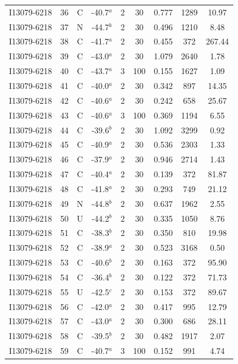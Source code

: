 \begin{table}
\begin{tabular}{ccccccccc}
I13079-6218 & 36 & C & -40.7$^{a}$ & 2 & 30 & 0.777 & 1289 & 10.97 \\
I13079-6218 & 37 & N & -44.7$^{b}$ & 2 & 30 & 0.496 & 1210 & 8.48 \\
I13079-6218 & 38 & C & -41.7$^{a}$ & 2 & 30 & 0.455 & 372 & 267.44 \\
I13079-6218 & 39 & C & -43.0$^{a}$ & 2 & 30 & 1.079 & 2640 & 1.78 \\
I13079-6218 & 40 & C & -43.7$^{a}$ & 3 & 100 & 0.155 & 1627 & 1.09 \\
I13079-6218 & 41 & C & -40.0$^{a}$ & 2 & 30 & 0.342 & 897 & 14.35 \\
I13079-6218 & 42 & C & -40.6$^{a}$ & 2 & 30 & 0.242 & 658 & 25.67 \\
I13079-6218 & 43 & C & -40.6$^{a}$ & 3 & 100 & 0.369 & 1194 & 6.55 \\
I13079-6218 & 44 & C & -39.6$^{b}$ & 2 & 30 & 1.092 & 3299 & 0.92 \\
I13079-6218 & 45 & C & -40.9$^{a}$ & 2 & 30 & 0.536 & 2303 & 1.33 \\
I13079-6218 & 46 & C & -37.9$^{a}$ & 2 & 30 & 0.946 & 2714 & 1.43 \\
I13079-6218 & 47 & C & -40.4$^{a}$ & 2 & 30 & 0.139 & 372 & 81.87 \\
I13079-6218 & 48 & C & -41.8$^{a}$ & 2 & 30 & 0.293 & 749 & 21.12 \\
I13079-6218 & 49 & N & -44.8$^{b}$ & 2 & 30 & 0.637 & 1962 & 2.55 \\
I13079-6218 & 50 & U & -44.2$^{b}$ & 2 & 30 & 0.335 & 1050 & 8.76 \\
I13079-6218 & 51 & C & -38.3$^{b}$ & 2 & 30 & 0.350 & 810 & 19.98 \\
I13079-6218 & 52 & C & -38.9$^{a}$ & 2 & 30 & 0.523 & 3168 & 0.50 \\
I13079-6218 & 53 & C & -40.6$^{b}$ & 2 & 30 & 0.163 & 372 & 95.90 \\
I13079-6218 & 54 & C & -36.4$^{b}$ & 2 & 30 & 0.122 & 372 & 71.73 \\
I13079-6218 & 55 & U & -42.5$^{c}$ & 2 & 30 & 0.153 & 372 & 89.67 \\
I13079-6218 & 56 & C & -42.0$^{a}$ & 2 & 30 & 0.417 & 995 & 12.79 \\
I13079-6218 & 57 & C & -43.0$^{a}$ & 2 & 30 & 0.300 & 686 & 28.11 \\
I13079-6218 & 58 & C & -39.5$^{b}$ & 2 & 30 & 0.482 & 1917 & 2.07 \\
I13079-6218 & 59 & C & -40.7$^{a}$ & 3 & 100 & 0.152 & 991 & 4.74 \\

\end{tabular}
\end{table}
